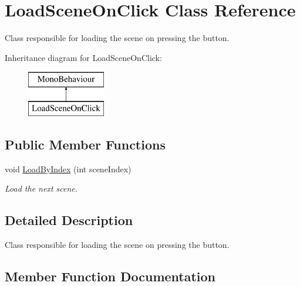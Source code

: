 \hypertarget{class_load_scene_on_click}{}\section{Load\+Scene\+On\+Click Class Reference}
\label{class_load_scene_on_click}


Class responsible for loading the scene on pressing the button.  


Inheritance diagram for Load\+Scene\+On\+Click\+:\begin{figure}[H]
\begin{center}
\leavevmode
\includegraphics[height=2.000000cm]{class_load_scene_on_click}
\end{center}
\end{figure}
\subsection*{Public Member Functions}
\begin{DoxyCompactItemize}
\item 
void \mbox{\hyperlink{class_load_scene_on_click_ade8cba31bec0944792d1ea3a053f7893}{Load\+By\+Index}} (int scene\+Index)
\begin{DoxyCompactList}\small\item\em Load the next scene. \end{DoxyCompactList}\end{DoxyCompactItemize}


\subsection{Detailed Description}
Class responsible for loading the scene on pressing the button. 

\subsection{Member Function Documentation}
\mbox{\label{class_load_scene_on_click_ade8cba31bec0944792d1ea3a053f7893}} 
